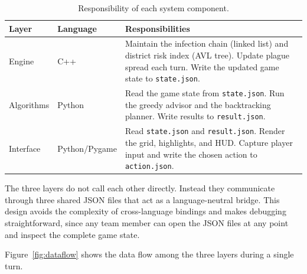 \documentclass[12pt, a4paper]{article}
\begin{document}
\begin{table}[ht]
\centering
\caption{Responsibility of each system component.}
\label{tab:components}
\begin{tabularx}{\linewidth}{|l|l|X|}
\hline
\textbf{Layer} & \textbf{Language} & \textbf{Responsibilities} \\
\hline
Engine     & C++            & Maintain the infection chain (linked list) and
                              district risk index (AVL tree). Update plague
                              spread each turn. Write the updated game state
                              to \texttt{state.json}. \\
\hline
Algorithms & Python         & Read the game state from \texttt{state.json}.
                              Run the greedy advisor and the backtracking
                              planner. Write results to
                              \texttt{result.json}. \\
\hline
Interface  & Python/Pygame  & Read \texttt{state.json} and
                              \texttt{result.json}. Render the grid,
                              highlights, and HUD. Capture player input and
                              write the chosen action to
                              \texttt{action.json}. \\
\hline
\end{tabularx}
\end{table}

The three layers do not call each other directly. Instead they communicate
through three shared JSON files that act as a language-neutral bridge. This
design avoids the complexity of cross-language bindings and makes debugging
straightforward, since any team member can open the JSON files at any point
and inspect the complete game state.

Figure~\ref{fig:dataflow} shows the data flow among the three layers during
a single turn.
\end{document}
